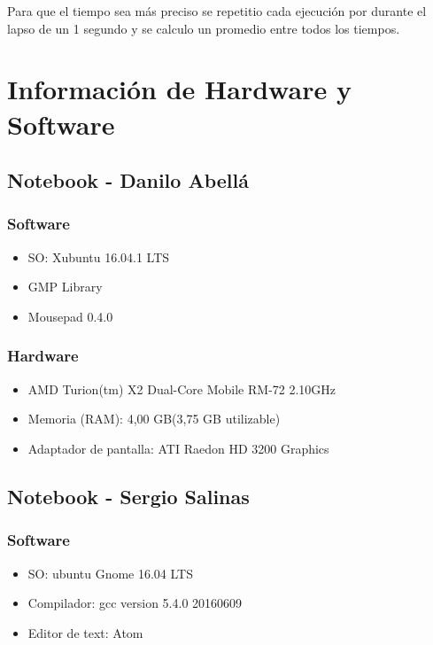 \documentclass[12pt,letterpaper]{scrartcl}
\begin{document}
Para que el tiempo sea más preciso se repetitio cada ejecución por durante el lapso de un 1 segundo y se calculo un promedio entre todos los tiempos.

\newpage

\section{Información de Hardware y Software}

\subsection{ Notebook - Danilo Abellá}
\subsubsection{Software}
\begin{itemize}
\item SO: Xubuntu 16.04.1 LTS
\item GMP Library
\item Mousepad 0.4.0
\end{itemize}

\subsubsection{Hardware}
\begin{itemize}
\item AMD Turion(tm) X2 Dual-Core Mobile RM-72 2.10GHz
\item Memoria (RAM): 4,00 GB(3,75 GB utilizable)
\item Adaptador de pantalla: ATI Raedon HD 3200 Graphics
\end{itemize}



\subsection{Notebook - Sergio Salinas}
\subsubsection{Software}
\begin{itemize}
\item  SO: ubuntu Gnome 16.04 LTS
\item Compilador: gcc version 5.4.0 20160609 
\item Editor de text: Atom
\end{itemize}
\end{document}

